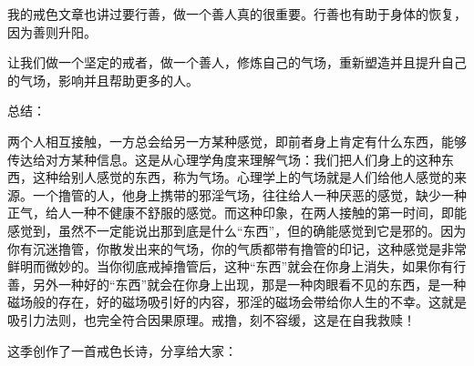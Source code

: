 \documentclass{ctexart}
\begin{document}
我的戒色文章也讲过要行善，做一个善人真的很重要。行善也有助于身体的恢复，因为善则升阳。

让我们做一个坚定的戒者，做一个善人，修炼自己的气场，重新塑造并且提升自己的气场，影响并且帮助更多的人。

总结：

两个人相互接触，一方总会给另一方某种感觉，即前者身上肯定有什么东西，能够传达给对方某种信息。这是从心理学角度来理解气场：我们把人们身上的这种东西，这种给别人感觉的东西，称为气场。心理学上的气场就是人们给他人感觉的来源。一个撸管的人，他身上携带的邪淫气场，往往给人一种厌恶的感觉，缺少一种正气，给人一种不健康不舒服的感觉。而这种印象，在两人接触的第一时间，即能感觉到，虽然不一定能说出那到底是什么“东西”，但的确能感觉到它是邪的。因为你有沉迷撸管，你散发出来的气场，你的气质都带有撸管的印记，这种感觉是非常鲜明而微妙的。当你彻底戒掉撸管后，这种“东西”就会在你身上消失，如果你有行善，另外一种好的“东西”就会在你身上出现，那是一种肉眼看不见的东西，是一种磁场般的存在，好的磁场吸引好的内容，邪淫的磁场会带给你人生的不幸。这就是吸引力法则，也完全符合因果原理。戒撸，刻不容缓，这是在自我救赎！

这季创作了一首戒色长诗，分享给大家：
\end{document}
